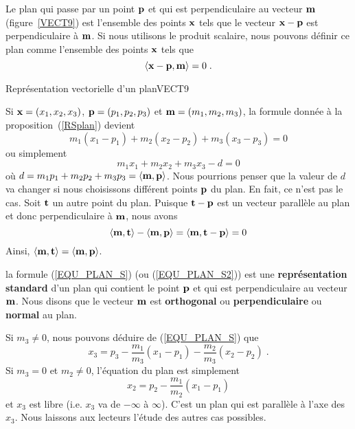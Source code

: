 {\begin{focus}{\prp} \label{RSplan}
Le plan qui passe par un point $\mathbf{p}$ et qui est perpendiculaire au
vecteur $\mathbf{m}$ (figure~\ref{VECT9}) est l'ensemble des
points $\mathbf{x}$ tels que le vecteur $\displaystyle \mathbf{x}-\mathbf{p}$ est
perpendiculaire à $\mathbf{m}$.  Si nous utilisons le produit scalaire, nous
pouvons définir ce plan comme l'ensemble des points $\mathbf{x}$ tels que
\[
\left\langle{\mathbf{x}-\mathbf{p}} , {\mathbf{m}}\right\rangle = 0 \; .
\]
\end{focus}

{Représentation vectorielle d'un plan}{VECT9}

Si $\displaystyle \mathbf{x}=(x_1,x_2,x_3)$, $\displaystyle \mathbf{p}=(p_1,p_2,p_3)$
et $\displaystyle \mathbf{m} = (m_1,m_2,m_3)$, la formule donnée à la
proposition~(\ref{RSplan}) devient
\begin{equation} \label{EQU_PLAN_S}
m_1 (x_1-p_1) + m_2 (x_2-p_2) + m_3 (x_3-p_3) = 0
\end{equation}
ou simplement
\begin{equation} \label{EQU_PLAN_S2}
m_1 x_1 + m_2 x_2 + m_3 x_3 - d = 0
\end{equation}
où $d = m_1 p_1 + m_2 p_2 + m_3 p_3 = \left\langle{\mathbf{m}} , {\mathbf{p}}\right\rangle$.  Nous
pourrions penser que la valeur de $d$ va changer si nous choisissons
différent points $\mathbf{p}$ du plan.  En fait, ce n'est pas le cas.
Soit $\mathbf{t}$ un autre point du plan.  Puisque
$\mathbf{t} - \mathbf{p}$ est un vecteur parallèle au plan et donc
perpendiculaire à $\mathbf{m}$, nous avons
\[
\left\langle{\mathbf{m}} , {\mathbf{t}}\right\rangle - \left\langle{\mathbf{m}} , {\mathbf{p}}\right\rangle 
= \left\langle{\mathbf{m}} , {\mathbf{t} - \mathbf{p}}\right\rangle = 0
\]
Ainsi, $\left\langle{\mathbf{m}} , {\mathbf{t}}\right\rangle = \left\langle{\mathbf{m}} , {\mathbf{p}}\right\rangle$.

\begin{focus}{\dfn}
la formule (\ref{EQU_PLAN_S}) (ou (\ref{EQU_PLAN_S2})\;) est une
{\bfseries représentation standard} d'un plan qui contient le point $\mathbf{p}$ et qui est
perpendiculaire au vecteur $\mathbf{m}$.  Nous disons que le vecteur $\mathbf{m}$
est {\bfseries orthogonal} ou {\bfseries perpendiculaire}
ou {\bfseries normal} au plan.
\end{focus}

Si $m_3 \neq 0$, nous pouvons déduire de (\ref{EQU_PLAN_S}) que
\[
x_3 = p_3 - \frac{m_1}{m_3} (x_1-p_1) - \frac{m_2}{m_3} (x_2- p_2) \;.
\]
Si $m_3 = 0$ et $m_2 \neq 0$, l'équation du plan est simplement
\[
x_2 = p_2 - \frac{m_1}{m_2} (x_1- p_1)
\]
et $x_3$ est libre (i.e. $x_3$ va de $-\infty$ à $\infty$).
C'est un plan qui est parallèle à l'axe des $x_3$.  Nous laissons aux lecteurs
l'étude des autres cas possibles.

}
